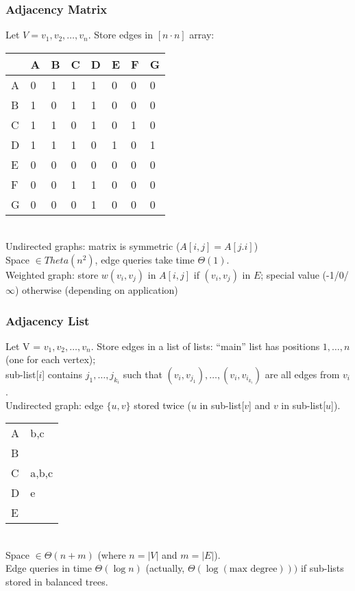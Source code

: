 \subsubsection*{Adjacency Matrix}

\noindent Let $V = {v_1,v_2,\ldots,v_n}$. Store edges in $[n \cdot n]$ array: \\

\begin{tabular}{l | l l l l l l l}
	& A & B & C & D & E & F & G \\ \hline
  A & 0 & 1 & 1 & 1 & 0 & 0 & 0 \\
  B & 1 & 0 & 1 & 1 & 0 & 0 & 0 \\
  C & 1 & 1 & 0 & 1 & 0 & 1 & 0 \\
  D & 1 & 1 & 1 & 0 & 1 & 0 & 1 \\
  E & 0 & 0 & 0 & 0 & 0 & 0 & 0 \\
  F & 0 & 0 & 1 & 1 & 0 & 0 & 0 \\
  G & 0 & 0 & 0 & 1 & 0 & 0 & 0 \\
\end{tabular} \\

\noindent Undirected graphs: matrix is symmetric ($A[i,j] = A[j.i]$) \\
Space $\in Theta(n^2)$, edge queries take time $\Theta(1)$. \\
Weighted graph: store $w(v_i,v_j)$ in $A[i,j]$ if $(v_i,v_j)$ in $E$; special value (-1/0/$\infty$) otherwise (depending on application)

\subsubsection*{Adjacency List}

Let V = ${v_1,v_2,\ldots,v_n}$. Store edges in a list of lists: ``main'' list has positions $1,\ldots,n$ (one for each vertex); \\
sub-list[$i$] contains $j_1,\ldots,j_{k_i}$ such that $(v_i,v_{j_1}), \ldots, (v_i,v_{i_{k_i}})$ are all edges from $v_i$. \\
Undirected graph: edge $\{u,v\}$ stored twice ($u$ in sub-list[$v$] and $v$ in
sub-list[$u$]). \\

\begin{tabular}{l | l}
	A & b,c \\
	B & \\
	C & a,b,c \\
	D & e \\
	E & \\
\end{tabular} \\

\noindent Space $\in \Theta(n+m)$ (where $n = |V|$ and $m = |E|$). \\
Edge queries in time $\Theta(\log n)$ (actually, $\Theta(\log (\textrm{max degree} )))$ if sub-lists stored in balanced trees.




